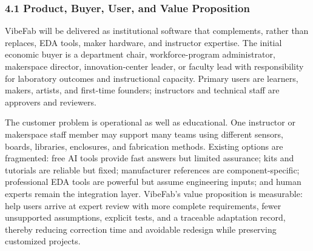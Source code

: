\documentclass[11pt,letterpaper]{article}
\begin{document}
\subsubsection*{4.1 Product, Buyer, User, and Value Proposition}
VibeFab will be delivered as institutional software that complements, rather than replaces, EDA tools, maker hardware, and instructor expertise. The initial economic buyer is a department chair, workforce-program administrator, makerspace director, innovation-center leader, or faculty lead with responsibility for laboratory outcomes and instructional capacity. Primary users are learners, makers, artists, and first-time founders; instructors and technical staff are approvers and reviewers.

The customer problem is operational as well as educational. One instructor or makerspace staff member may support many teams using different sensors, boards, libraries, enclosures, and fabrication methods. Existing options are fragmented: free AI tools provide fast answers but limited assurance; kits and tutorials are reliable but fixed; manufacturer references are component-specific; professional EDA tools are powerful but assume engineering inputs; and human experts remain the integration layer. VibeFab's value proposition is measurable: help users arrive at expert review with more complete requirements, fewer unsupported assumptions, explicit tests, and a traceable adaptation record, thereby reducing correction time and avoidable redesign while preserving customized projects.
\end{document}
